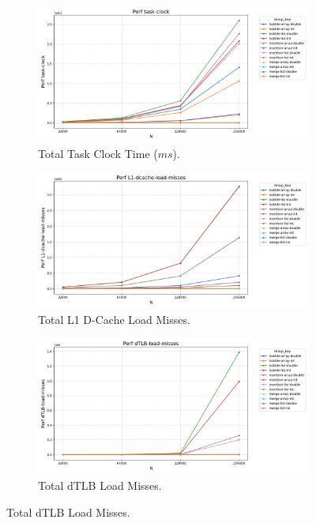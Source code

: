 \documentclass[11pt, a4paper]{article}
\begin{document}
\begin{figure}[h]
    \vspace{0.5cm} %

    \begin{subfigure}[b]{0.32\textwidth}
        \centering
        \includegraphics[width=\textwidth]{plots/_task-clock.png}
        \caption{Total Task Clock Time ($ms$).}
        \label{fig:app_sub_task_clock}
    \end{subfigure}
    \hfill
    \begin{subfigure}[b]{0.32\textwidth}
        \centering
        \includegraphics[width=\textwidth]{plots/_l1-dcache-load-misses.png}
        \caption{Total L1 D-Cache Load Misses.}
        \label{fig:app_sub_l1dcache}
    \end{subfigure}
    \hfill
    \begin{subfigure}[b]{0.32\textwidth}
        \centering
        \includegraphics[width=\textwidth]{plots/_dtlb-load-misses.png}
        \caption{Total dTLB Load Misses.}
        \label{fig:app_sub_dtlb}
    \end{subfigure}


\end{figure}
\end{document}
